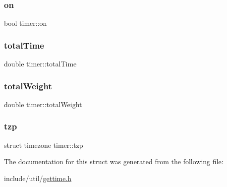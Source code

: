 \mbox{\label{structtimer_ad3b99f09a2fbfa987e9f535879e94a16}} 
\subsubsection{\texorpdfstring{on}{on}}
{\footnotesize\ttfamily bool timer\+::on}

\mbox{\label{structtimer_a0c1f154ef20ab5ae19b1e2c8cec63375}} 
\subsubsection{\texorpdfstring{totalTime}{totalTime}}
{\footnotesize\ttfamily double timer\+::total\+Time}

\mbox{\label{structtimer_ab294a219339c97d333c0d4e11bf8636b}} 
\subsubsection{\texorpdfstring{totalWeight}{totalWeight}}
{\footnotesize\ttfamily double timer\+::total\+Weight}

\mbox{\label{structtimer_a19827c3cd19867fd078b3860e17d0754}} 
\subsubsection{\texorpdfstring{tzp}{tzp}}
{\footnotesize\ttfamily struct timezone timer\+::tzp}



The documentation for this struct was generated from the following file\+:\begin{DoxyCompactItemize}
\item 
include/util/\mbox{\hyperlink{gettime_8h}{gettime.\+h}}\end{DoxyCompactItemize}
